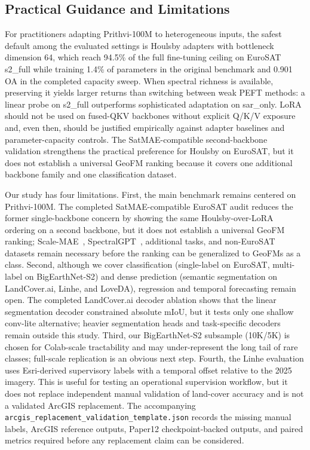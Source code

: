 \documentclass[11pt]{article}
\begin{document}
\subsection{Practical Guidance and Limitations}
For practitioners adapting Prithvi-100M to heterogeneous inputs, the safest default among the evaluated settings is Houlsby adapters with bottleneck dimension 64, which reach 94.5\% of the full fine-tuning ceiling on EuroSAT s2\_full while training 1.4\% of parameters in the original benchmark and 0.901 OA in the completed capacity sweep. When spectral richness is available, preserving it yields larger returns than switching between weak PEFT methods: a linear probe on s2\_full outperforms sophisticated adaptation on sar\_only. LoRA should not be used on fused-QKV backbones without explicit Q/K/V exposure and, even then, should be justified empirically against adapter baselines and parameter-capacity controls. The SatMAE-compatible second-backbone validation strengthens the practical preference for Houlsby on EuroSAT, but it does not establish a universal GeoFM ranking because it covers one additional backbone family and one classification dataset.

Our study has four limitations. First, the main benchmark remains centered on Prithvi-100M. The completed SatMAE-compatible EuroSAT audit reduces the former single-backbone concern by showing the same Houlsby-over-LoRA ordering on a second backbone, but it does not establish a universal GeoFM ranking; Scale-MAE~\cite{reed2023scalemae}, SpectralGPT~\cite{hong2024spectralgpt}, additional tasks, and non-EuroSAT datasets remain necessary before the ranking can be generalized to GeoFMs as a class. Second, although we cover classification (single-label on EuroSAT, multi-label on BigEarthNet-S2) and dense prediction (semantic segmentation on LandCover.ai, Linhe, and LoveDA), regression and temporal forecasting remain open. The completed LandCover.ai decoder ablation shows that the linear segmentation decoder constrained absolute mIoU, but it tests only one shallow conv-lite alternative; heavier segmentation heads and task-specific decoders remain outside this study. Third, our BigEarthNet-S2 subsample (10K/5K) is chosen for Colab-scale tractability and may under-represent the long tail of rare classes; full-scale replication is an obvious next step. Fourth, the Linhe evaluation uses Esri-derived supervisory labels with a temporal offset relative to the 2025 imagery. This is useful for testing an operational supervision workflow, but it does not replace independent manual validation of land-cover accuracy and is not a validated ArcGIS replacement. The accompanying \texttt{arcgis\_replacement\_validation\_template.json} records the missing manual labels, ArcGIS reference outputs, Paper12 checkpoint-backed outputs, and paired metrics required before any replacement claim can be considered.
\end{document}
